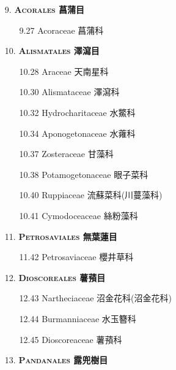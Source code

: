 \begin{enumerate}
  \item[9. ] \textbf{\textsc{Acorales} 菖蒲目} 
    \begin{enumerate}
      \item[9.27] Acoraceae 菖蒲科  
        
    \end{enumerate}
  \item[10. ] \textbf{\textsc{Alismatales} 澤瀉目} 
    \begin{enumerate}
      \item[10.28] Araceae 天南星科  
        
      \item[10.30] Alismataceae 澤瀉科  
        
      \item[10.32] Hydrocharitaceae 水鱉科  
        
      \item[10.34] Aponogetonaceae 水蕹科  
        
      \item[10.37] Zosteraceae 甘藻科  
        
      \item[10.38] Potamogetonaceae 眼子菜科  
        
      \item[10.40] Ruppiaceae 流蘇菜科(川蔓藻科)  
        
      \item[10.41] Cymodoceaceae 絲粉藻科  
        
    \end{enumerate}
  \item[11. ] \textbf{\textsc{Petrosaviales} 無葉蓮目} 
    \begin{enumerate}
      \item[11.42] Petrosaviaceae 櫻井草科  
        
    \end{enumerate}
  \item[12. ] \textbf{\textsc{Dioscoreales} 薯蕷目} 
    \begin{enumerate}
      \item[12.43] Nartheciaceae 沼金花科(沼金花科)  
        
      \item[12.44] Burmanniaceae 水玉簪科  
        
      \item[12.45] Dioscoreaceae 薯蕷科  
        
    \end{enumerate}
  \item[13. ] \textbf{\textsc{Pandanales} 露兜樹目} 
    \begin{enumerate}

\end{enumerate}
\end{enumerate}
